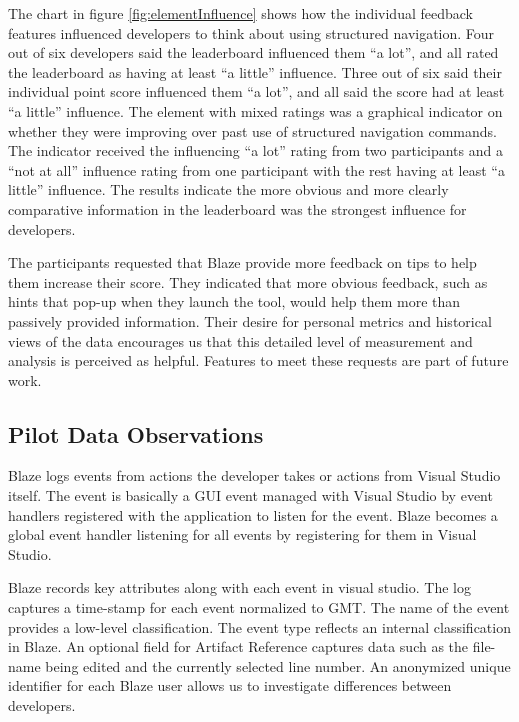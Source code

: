 \documentclass{sig-alternate}
\begin{document}
The chart in figure \ref{fig:elementInfluence} shows how the individual feedback features influenced developers to think about using structured navigation.  Four out of six developers said the leaderboard influenced them ``a lot'', and all rated the leaderboard as having at least ``a little'' influence.  Three out of six  said their individual point score influenced them ``a lot'', and all said the score had at least ``a little'' influence.  The element with mixed ratings was a graphical indicator on whether they were improving over past use of structured navigation commands.  The indicator received the influencing ``a lot'' rating from two participants and a ``not at all'' influence rating from one participant with the rest having at least ``a little'' influence.  The results indicate the more obvious and more clearly comparative information in the leaderboard was the strongest influence for developers.

The participants requested that Blaze provide more feedback on tips to help them increase their score. They indicated that more obvious feedback, such as hints that pop-up when they launch the tool, would help them more than passively provided information.  Their desire for personal metrics and historical views of the data encourages us that this detailed level of measurement and analysis is perceived as helpful.  Features to meet these requests are part of future work.    

\subsection{Pilot Data Observations}

Blaze logs events from actions the developer takes or actions from Visual Studio itself.  The event is basically a GUI event managed with Visual Studio by event handlers registered with the application to listen for the event.  Blaze becomes a global event handler listening for all events by registering for them in Visual Studio.  

Blaze records key attributes along with each event in visual studio.  The log captures a time-stamp for each event normalized to GMT.  The name of the event provides a low-level classification.  The event type reflects an internal classification in Blaze.  An optional field for Artifact Reference captures data such as the file-name being edited and the currently selected line number.  An anonymized unique identifier for each Blaze user allows us to investigate differences between developers.
\end{document}

